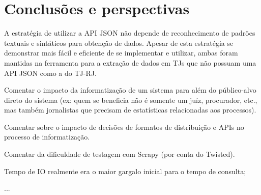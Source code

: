 \chapter{Conclusões e perspectivas~\label{chp:conclusions}}

A estratégia de utilizar a API JSON não depende de reconhecimento de padrões
textuais e sintáticos para obtenção de dados. Apesar de esta estratégia se
demonstrar mais fácil e eficiente de se implementar e utilizar, ambas foram
mantidas na ferramenta para a extração de dados em TJs que não possuam uma API
JSON como a do TJ-RJ.

\begin{todolist}
    \item Comentar o impacto da informatização de um sistema para além do
          público-alvo direto do sistema (ex: quem se beneficia não é somente
          um juíz, procurador, etc., mas também jornalistas que precisam de
          estatísticas relacionadas aos processos).
    \item Comentar sobre o impacto de decisões de formatos de distribuição e
          APIs no processo de informatização.
\end{todolist}

\begin{todolist}
    \item Comentar da dificuldade de testagem com Scrapy (por conta do Twisted).
\end{todolist}


\begin{todolist}
    \item Tempo de IO realmente era o maior gargalo inicial para o tempo de consulta;
    \item ...
\end{todolist}

